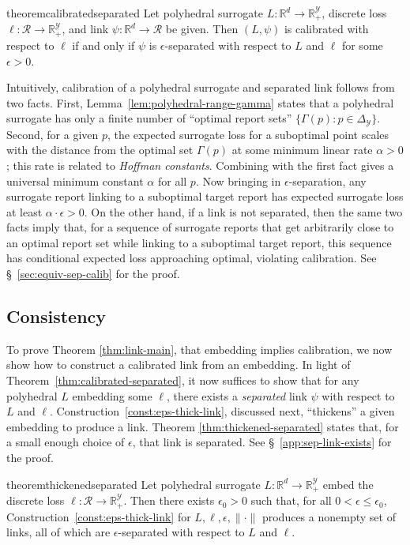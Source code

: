 \documentclass[twoside,11pt]{article}
\newcommand{\restatehack}[1]{}   %
\newcommand{\reals}{\mathbb{R}}
\newcommand{\simplex}{\Delta_\Y}
\newcommand{\R}{\mathcal{R}}
\newcommand{\Y}{\mathcal{Y}}
\begin{document}
\begin{restatable}{theorem}{calibratedseparated} \label{thm:calibrated-separated}
  Let polyhedral surrogate $L:\reals^d \to \reals^\Y_+$, discrete loss $\ell:\R\to\reals^\Y_+$, and link $\psi:\reals^d\to\R$ be given.
  Then $(L,\psi)$ is calibrated with respect to $\ell$ if and only if
  $\psi$ is $\epsilon$-separated with respect to $L$ and $\ell$ for some
  $\epsilon>0$.
\end{restatable}
Intuitively, calibration of a polyhedral surrogate and separated link follows from two facts.
First, Lemma~\ref{lem:polyhedral-range-gamma} states that a polyhedral surrogate has only a finite number of ``optimal report sets'' $\{\Gamma(p) : p \in \simplex\}$.
Second, for a given $p$, the expected surrogate loss for a suboptimal point scales with the distance from the optimal set $\Gamma(p)$ at some minimum linear rate $\alpha > 0$; this rate is related to \emph{Hoffman constants}.
Combining with the first fact gives a universal minimum constant $\alpha$ for all $p$.
Now bringing in $\epsilon$-separation, any surrogate report linking to a suboptimal target report has expected surrogate loss at least $\alpha \cdot \epsilon > 0$.
On the other hand, if a link is not separated, then the same two facts imply that, for a sequence of surrogate reports that get arbitrarily close to an optimal report set while linking to a suboptimal target report, this sequence has conditional expected loss approaching optimal, violating calibration.
See \S~\ref{sec:equiv-sep-calib} for the proof.

\subsection{Consistency}

\restatehack{
  \begin{theorem}
    \label{thm:calibrated-separated}
    \label{thm:thickened-separated}
  \end{theorem}}

To prove Theorem \ref{thm:link-main}, that embedding implies calibration, we now show how to construct a calibrated link from an embedding.
In light of Theorem~\ref{thm:calibrated-separated}, it now suffices to show that for any polyhedral $L$ embedding some $\ell$, there exists a \emph{separated} link $\psi$ with respect to $L$ and $\ell$.
Construction~\ref{const:eps-thick-link}, discussed next, ``thickens'' a given embedding to produce a link.
Theorem \ref{thm:thickened-separated} states that, for a small enough choice of $\epsilon$, that link is separated.
See \S~\ref{app:sep-link-exists} for the proof.
\begin{restatable}{theorem}{thickenedseparated} \label{thm:thickened-separated}
  Let polyhedral surrogate $L:\reals^d \to \reals^\Y_+$ embed the discrete loss $\ell:\R\to\reals^\Y_+$.
  Then there exists $\epsilon_0 > 0$ such that, for all $0 < \epsilon \leq \epsilon_0$, Construction~\ref{const:eps-thick-link} for $L,\ell,\epsilon,\|\cdot\|$ produces a nonempty set of links, all of which are $\epsilon$-separated with respect to $L$ and $\ell$.
\end{restatable}
\end{document}
